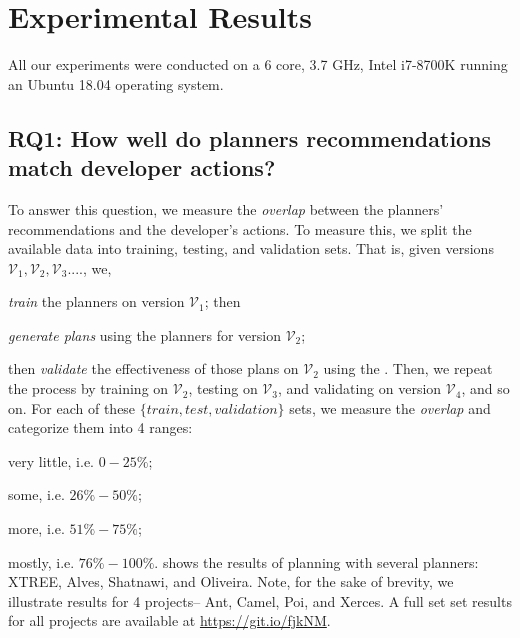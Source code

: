 \section{Experimental Results}
\label{sect:results}

All our experiments were conducted on a 6 core, 3.7 GHz, Intel i7-8700K running an Ubuntu 18.04 operating system. 

\subsection*{{\bf RQ1: How well do planners recommendations match  developer actions?}}


To answer this question, we measure the \textit{overlap} between the planners' recommendations and the developer's actions. To measure this, we split the available data into training, testing, and validation sets. That is, given versions $\mathcal{V}_1, \mathcal{V}_2, \mathcal{V}_3....$, we, 
\be
\item {\em train} the planners on version $\mathcal{V}_1$; then 
\item {\em generate plans} using the planners for version $\mathcal{V}_2$;
\item then {\em validate} the effectiveness of those plans on $\mathcal{V}_2$ using the \ktest.
\ee
Then,  we repeat the process by training on $\mathcal{V}_2$, testing on $\mathcal{V}_3$, and validating on version $\mathcal{V}_4$, and so on. For each of these $\{train, test, validation\}$ sets, we measure the \textit{overlap} and categorize them into 4 ranges:
\bi
\item very little, i.e. $0-25\%$;
\item some, i.e. $26\%-50\%$;
\item more, i.e. $51\%-75\%$;
\item mostly, i.e. $76\%-100\%$.
\ei
{} shows the results of planning with several planners: XTREE, Alves, Shatnawi, and Oliveira. Note, for the sake of brevity, we illustrate results for 4 projects-- Ant, Camel, Poi, and Xerces. A full set set results for all projects are available at  \url{https://git.io/fjkNM}. 

